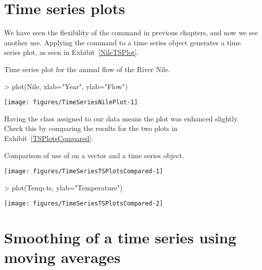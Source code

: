 \section{Time series plots}

We have seen the flexibility of the  command in previous chapters, and now we see another use. Applying the  command to a time series object generates a time series plot, as seen in Exhibit~\ref{NileTSPlot}.
\begin{exhibit}
\begin{center}
\caption{Time series plot for the annual flow of the River Nile.}
\label{NileTSPlot}
\begin{Schunk}
\begin{Sinput}
> plot(Nile, xlab="Year", ylab="Flow")
\end{Sinput}

\texttt{[image: figures/TimeSeriesNilePlot-1]} \end{Schunk}
\end{center}
\end{exhibit}

Having the class assigned to our data means the plot was enhanced slightly. Check this by comparing the results for the two plots in Exhibit~\ref{TSPlotsCompared}.
\begin{exhibit}
\begin{center}
\caption{Comparison of use of  on a vector and a time series object.}
\label{TSPlotsCompared}
\begin{Schunk}

\texttt{[image: figures/TimeSeriesTSPlotsCompared-1]} \begin{Sinput}
> plot(Temp.ts, ylab="Temperature")
\end{Sinput}

\texttt{[image: figures/TimeSeriesTSPlotsCompared-2]} \end{Schunk}
\end{center}
\end{exhibit}

\section{Smoothing of a time series using moving averages}

